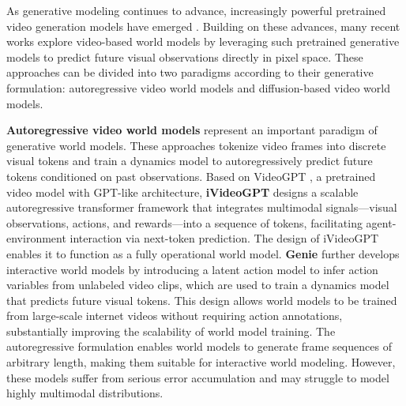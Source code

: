 As generative modeling continues to advance, increasingly powerful pretrained video generation models have emerged \cite{VideoGPT, hong2022cogvideolargescalepretrainingtexttovideo, MAGVIT, CogVideoX, Video_Diffusion_Model, Stable_Video_Diffusion, wu2021nuwavisualsynthesispretraining}. Building on these advances, many recent works explore video-based world models by leveraging such pretrained generative models to predict future visual observations directly in pixel space. These approaches can be divided into two paradigms according to their generative formulation: autoregressive video world models and diffusion-based video world models.

\textbf{Autoregressive video world models} represent an important paradigm of generative world models. These approaches tokenize video frames into discrete visual tokens and train a dynamics model to autoregressively predict future tokens conditioned on past observations. Based on VideoGPT \cite{VideoGPT}, a pretrained video model with GPT-like architecture, \textbf{iVideoGPT} \cite{iVideoGPT} designs a scalable autoregressive transformer framework that integrates multimodal signals—visual observations, actions, and rewards—into a sequence of tokens, facilitating agent-environment interaction via next-token prediction. The design of iVideoGPT enables it to function as a fully operational world model. \textbf{Genie} \cite{Genie} further develops interactive world models by introducing a latent action model to infer action variables from unlabeled video clips, which are used to train a dynamics model that predicts future visual tokens. This design allows world models to be trained from large-scale internet videos without requiring action annotations, substantially improving the scalability of world model training. The autoregressive formulation enables world models to generate frame sequences of arbitrary length, making them suitable for interactive world modeling. However, these models suffer from serious error accumulation and may struggle to model highly multimodal distributions. 

